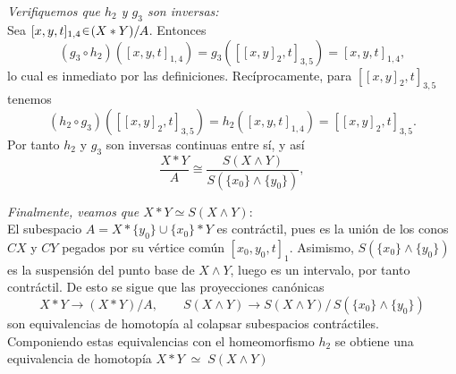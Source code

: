 \begin{sol}[Demostración]
\vspace{1em}\emph{Verifiquemos que $h_2$ y $g_3$ son inversas:}\\
Sea $[x,y,t]_{1,4}\en (X*Y)/A$. Entonces
\[
(g_3\circ h_2)([x,y,t]_{1,4})
    = g_3([[x,y]_2,t]_{3,5})
    = [x,y,t]_{1,4},
\]
lo cual es inmediato por las definiciones. Recíprocamente, para $[[x,y]_2,t]_{3,5}$ tenemos
\[
(h_2\circ g_3)([[x,y]_2,t]_{3,5})
    = h_2([x,y,t]_{1,4})
    = [[x,y]_2,t]_{3,5}.
\]
Por tanto $h_2$ y $g_3$ son inversas continuas entre sí, y así
\[
\frac{X*Y}{A}
\cong
\frac{S(X\wedge Y)}{S(\{x_0\}\wedge\{y_0\})},
\]

\vspace{1em}\emph{Finalmente, veamos que $X * Y \simeq S(X \wedge Y)$}:\\
El subespacio $A=X*\{y_0\}\cup\{x_0\}*Y$ es contráctil, pues es la unión de los conos 
$CX$ y $CY$ pegados por su vértice común $[x_0,y_0,t]_1$. Asimismo,
$S(\{x_0\}\wedge\{y_0\})$ es la suspensión del punto base de $X\wedge Y$, luego es un intervalo, 
por tanto contráctil. De esto se sigue que las proyecciones canónicas
\[
X*Y \longrightarrow (X*Y)/A,
\qquad
S(X\wedge Y) \longrightarrow S(X\wedge Y)\big/\,S(\{x_0\}\wedge\{y_0\})
\]
son equivalencias de homotopía al colapsar subespacios contráctiles. 
Componiendo estas equivalencias con el homeomorfismo $h_2$ se obtiene una equivalencia de homotopía
\(
X*Y \;\simeq\; S(X\wedge Y)
\)
\end{sol}
